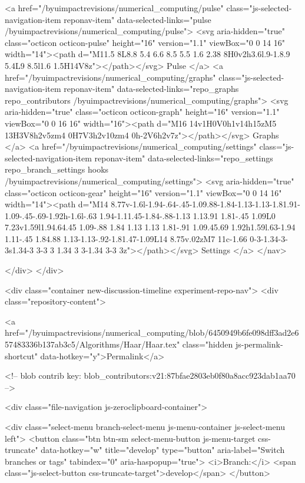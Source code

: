   <a href="/byuimpactrevisions/numerical_computing/pulse" class="js-selected-navigation-item reponav-item" data-selected-links="pulse /byuimpactrevisions/numerical_computing/pulse">
    <svg aria-hidden="true" class="octicon octicon-pulse" height="16" version="1.1" viewBox="0 0 14 16" width="14"><path d="M11.5 8L8.8 5.4 6.6 8.5 5.5 1.6 2.38 8H0v2h3.6l.9-1.8.9 5.4L9 8.5l1.6 1.5H14V8z"></path></svg>
    Pulse
</a>
  <a href="/byuimpactrevisions/numerical_computing/graphs" class="js-selected-navigation-item reponav-item" data-selected-links="repo_graphs repo_contributors /byuimpactrevisions/numerical_computing/graphs">
    <svg aria-hidden="true" class="octicon octicon-graph" height="16" version="1.1" viewBox="0 0 16 16" width="16"><path d="M16 14v1H0V0h1v14h15zM5 13H3V8h2v5zm4 0H7V3h2v10zm4 0h-2V6h2v7z"></path></svg>
    Graphs
</a>
    <a href="/byuimpactrevisions/numerical_computing/settings" class="js-selected-navigation-item reponav-item" data-selected-links="repo_settings repo_branch_settings hooks /byuimpactrevisions/numerical_computing/settings">
      <svg aria-hidden="true" class="octicon octicon-gear" height="16" version="1.1" viewBox="0 0 14 16" width="14"><path d="M14 8.77v-1.6l-1.94-.64-.45-1.09.88-1.84-1.13-1.13-1.81.91-1.09-.45-.69-1.92h-1.6l-.63 1.94-1.11.45-1.84-.88-1.13 1.13.91 1.81-.45 1.09L0 7.23v1.59l1.94.64.45 1.09-.88 1.84 1.13 1.13 1.81-.91 1.09.45.69 1.92h1.59l.63-1.94 1.11-.45 1.84.88 1.13-1.13-.92-1.81.47-1.09L14 8.75v.02zM7 11c-1.66 0-3-1.34-3-3s1.34-3 3-3 3 1.34 3 3-1.34 3-3 3z"></path></svg>
      Settings
</a>
</nav>

  </div>
</div>

<div class="container new-discussion-timeline experiment-repo-nav">
  <div class="repository-content">

    

<a href="/byuimpactrevisions/numerical_computing/blob/6450949b6fe098dff3ad2e657483336b137ab3c5/Algorithms/Haar/Haar.tex" class="hidden js-permalink-shortcut" data-hotkey="y">Permalink</a>

<!-- blob contrib key: blob_contributors:v21:87bfae2803eb0f80a8acc923dab1aa70 -->

<div class="file-navigation js-zeroclipboard-container">
  
<div class="select-menu branch-select-menu js-menu-container js-select-menu left">
  <button class="btn btn-sm select-menu-button js-menu-target css-truncate" data-hotkey="w"
    title="develop"
    type="button" aria-label="Switch branches or tags" tabindex="0" aria-haspopup="true">
    <i>Branch:</i>
    <span class="js-select-button css-truncate-target">develop</span>
  </button>

